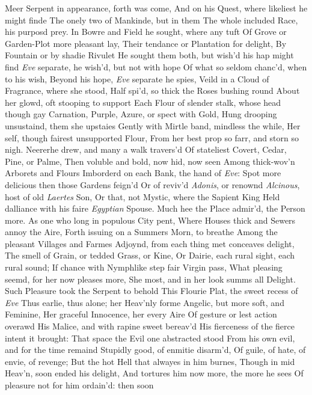 \documentclass[11pt]{book}
\begin{document}
Meer Serpent in appearance, forth was come, 
And on his Quest, where likeliest he might finde 
The onely two of Mankinde, but in them 
The whole included Race, his purposd prey. 
In Bowre and Field he sought, where any tuft 
Of Grove or Garden-Plot more pleasant lay, 
Their tendance or Plantation for delight, 
By Fountain or by shadie Rivulet 
He sought them both, but wish'd his hap might find 
\textit{Eve} separate, he wish'd, but not with hope 
Of what so seldom chanc'd, when to his wish, 
Beyond his hope, \textit{Eve} separate he spies, 
Veild in a Cloud of Fragrance, where she stood, 
Half spi'd, so thick the Roses bushing round 
About her glowd, oft stooping to support 
Each Flour of slender stalk, whose head though gay 
Carnation, Purple, Azure, or spect with Gold, 
Hung drooping unsustaind, them she upstaies 
Gently with Mirtle band, mindless the while, 
Her self, though fairest unsupported Flour, 
From her best prop so farr, and storn so nigh. 
Neererhe drew, and many a walk travers'd 
Of stateliest Covert, Cedar, Pine, or Palme, 
Then voluble and bold, now hid, now seen 
Among thick-wov'n Arborets and Flours 
Imborderd on each Bank, the hand of \textit{Eve}: 
Spot more delicious then those Gardens feign'd 
Or of reviv'd \textit{Adonis}, or renownd 
\textit{Alcinous}, host of old \textit{Laertes} Son, 
Or that, not Mystic, where the Sapient King 
Held dalliance with his faire \textit{Egyptian} Spouse. 
Much hee the Place admir'd, the Person more. 
As one who long in populous City pent, 
Where Houses thick and Sewers annoy the Aire, 
Forth issuing on a Summers Morn, to breathe 
Among the pleasant Villages and Farmes 
Adjoynd, from each thing met conceaves delight, 
The smell of Grain, or tedded Grass, or Kine, 
Or Dairie, each rural sight, each rural sound; 
If chance with Nymphlike step fair Virgin pass, 
What pleasing seemd, for her now pleases more, 
She most, and in her look summs all Delight. 
Such Pleasure took the Serpent to behold 
This Flourie Plat, the sweet recess of \textit{Eve} 
Thus earlie, thus alone; her Heav'nly forme 
Angelic, but more soft, and Feminine, 
Her graceful Innocence, her every Aire 
Of gesture or lest action overawd 
His Malice, and with rapine sweet bereav'd 
His fierceness of the fierce intent it brought: 
That space the Evil one abstracted stood 
From his own evil, and for the time remaind 
Stupidly good, of enmitie disarm'd, 
Of guile, of hate, of envie, of revenge; 
But the hot Hell that alwayes in him burnes, 
Though in mid Heav'n, soon ended his delight, 
And tortures him now more, the more he sees 
Of pleasure not for him ordain'd: then soon 
\end{document}
